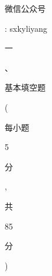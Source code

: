 \documentclass[10pt]{article}
\begin{document}
\begin{CJK}{UTF8}{mj}微信公众号\end{CJK}: sxkyliyang

\begin{CJK}{UTF8}{mj}一\end{CJK}、\begin{CJK}{UTF8}{mj}基本填空题\end{CJK}(\begin{CJK}{UTF8}{mj}每小题\end{CJK} 5 \begin{CJK}{UTF8}{mj}分\end{CJK}, \begin{CJK}{UTF8}{mj}共\end{CJK} 85 \begin{CJK}{UTF8}{mj}分\end{CJK})
\end{document}
